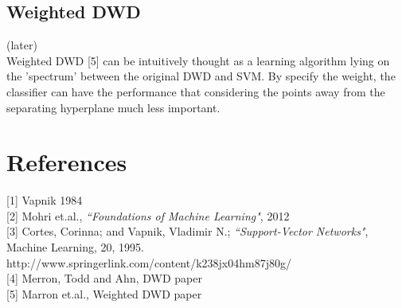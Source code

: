 \documentclass[12pt]{article}
\theoremstyle{definition}
\theoremstyle{remark}
\numberwithin{equation}{section}
\begin{document}
\subsection{Weighted DWD}
(later) \\[0.2cm]
Weighted DWD [5] can be intuitively thought as a learning algorithm lying on the 'spectrum' between the original DWD and SVM. By specify the weight, the classifier can have the performance that considering the points away from the separating hyperplane much less important. 
\section{References}
[1] Vapnik 1984 \\[0.2cm]
[2] Mohri et.al., \emph{``Foundations of Machine Learning"}, 2012 \\ [0.2cm]
[3] Cortes, Corinna; and Vapnik, Vladimir N.; \emph{``Support-Vector Networks"}, Machine Learning, 20, 1995.\\ http://www.springerlink.com/content/k238jx04hm87j80g/ \\[0.2cm]
[4] Merron, Todd and Ahn, DWD paper \\[0.2cm]
[5] Marron et.al., Weighted DWD paper
\end{document}
